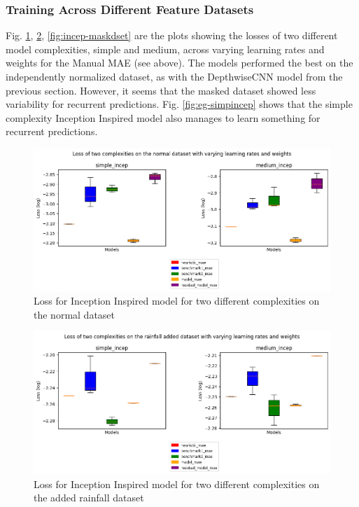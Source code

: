 \subsubsection*{Training Across Different Feature Datasets}
Fig. \ref{fig:incep-normaldset}, \ref{fig:incep-rfdset}, \ref{fig:incep-maskdset} are the plots showing the losses of two different model complexities, simple and medium, across varying learning rates and weights for the Manual MAE (see above). The models performed the best on the independently normalized dataset, as with the DepthwiseCNN model from the previous section. However, it seems that the masked dataset showed  less variability for recurrent predictions. Fig. \ref{fig:eg-simpincep} shows that the simple complexity Inception Inspired model also manages to learn something for recurrent predictions.


\begin{figure}[tbph]
	\centering
	\includegraphics[width=0.8\linewidth, height=0.3\textheight]{Figures/Results/Inception_model/normal_dataset}
	\caption[Loss for Inception Inspired model for two different complexities on the normal dataset]{Loss for Inception Inspired model for two different complexities on the normal dataset}
	\label{fig:incep-normaldset}
\end{figure}


\begin{figure}[tbph]
	\centering
	\includegraphics[width=0.8\linewidth, height=0.3\textheight]{Figures/Results/Inception_model/rainfall_dataset}
	\caption[Loss for Inception Inspired model for two different complexities on the added rainfall dataset]{Loss for Inception Inspired model for two different complexities on the added rainfall dataset}
	\label{fig:incep-rfdset}
\end{figure}


